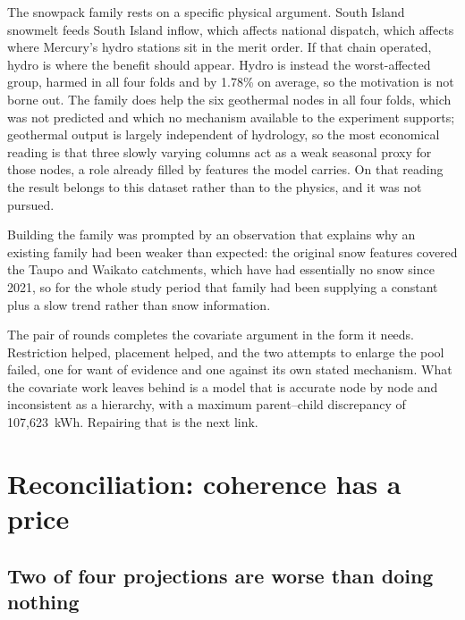 The snowpack family rests on a specific physical argument. South Island snowmelt feeds South
Island inflow, which affects national dispatch, which affects where Mercury's hydro stations
sit in the merit order. If that chain operated, hydro is where the benefit should appear.
Hydro is instead the worst-affected group, harmed in all four folds and by 1.78\% on
average, so the motivation is not borne out. The family does help the six geothermal nodes
in all four folds, which was not predicted and which no mechanism available to the
experiment supports; geothermal output is largely independent of hydrology, so the most
economical reading is that three slowly varying columns act as a weak seasonal proxy for
those nodes, a role already filled by features the model carries. On that reading the result
belongs to this dataset rather than to the physics, and it was not pursued.

Building the family was prompted by an observation that explains why an existing family had
been weaker than expected: the original snow features covered the Taupo and Waikato
catchments, which have had essentially no snow since 2021, so for the whole study period
that family had been supplying a constant plus a slow trend rather than snow information.

The pair of rounds completes the covariate argument in the form it needs. Restriction
helped, placement helped, and the two attempts to enlarge the pool failed, one for want of
evidence and one against its own stated mechanism. What the covariate work leaves behind is
a model that is accurate node by node and inconsistent as a hierarchy, with a maximum
parent--child discrepancy of 107,623~kWh. Repairing that is the next link.

\section{Reconciliation: coherence has a price}
\label{sec:res-recon}

\subsection{Two of four projections are worse than doing nothing}

